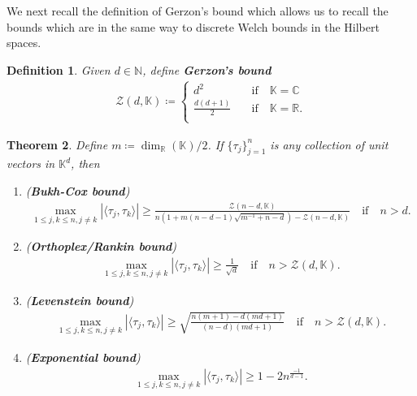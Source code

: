 \documentclass{amsart}
\newtheorem{theorem}{Theorem}[section]
\newtheorem{definition}[theorem]{Definition}
\begin{document}
We next recall the definition of Gerzon's bound which allows us to recall  the bounds which are in the same way  to discrete Welch bounds in the Hilbert spaces. 
 \begin{definition}\cite{JASPERKINGMIXON}
	Given $d\in \mathbb{N}$, define \textbf{Gerzon's bound}
	\begin{align*}
		\mathcal{Z}(d, \mathbb{K})\coloneqq 
		\left\{ \begin{array}{cc} 
			d^2 & \quad \text{if} \quad \mathbb{K} =\mathbb{C}\\
			\frac{d(d+1)}{2} & \quad \text{if} \quad \mathbb{K} =\mathbb{R}.\\
		\end{array} \right.
	\end{align*}	
\end{definition}
\begin{theorem}\cite{JASPERKINGMIXON, XIACORRECTION, MUKKAVILLISABHAWALERKIPAAZHANG, SOLTANALIAN, BUKHCOX, CONWAYHARDINSLOANE, HAASHAMMENMIXON, RANKIN}  \label{LEVENSTEINBOUND}
	Define $m\coloneqq \operatorname{dim}_{\mathbb{R}}(\mathbb{K})/2$.	If	$\{\tau_j\}_{j=1}^n$  is any collection of  unit vectors in $\mathbb{K}^d$, then
	\begin{enumerate}[\upshape(i)]
		\item (\textbf{Bukh-Cox bound})
		\begin{align*}
			\max _{1\leq j,k \leq n, j\neq k}|\langle \tau_j, \tau_k\rangle |\geq \frac{\mathcal{Z}(n-d, \mathbb{K})}{n(1+m(n-d-1)\sqrt{m^{-1}+n-d})-\mathcal{Z}(n-d, \mathbb{K})}\quad \text{if} \quad n>d.
		\end{align*}
		\item (\textbf{Orthoplex/Rankin bound})	
		\begin{align*}
			\max _{1\leq j,k \leq n, j\neq k}|\langle \tau_j, \tau_k\rangle |\geq\frac{1}{\sqrt{d}} \quad \text{if} \quad n>\mathcal{Z}(d, \mathbb{K}).
		\end{align*}
		\item (\textbf{Levenstein bound})	
		\begin{align*}
			\max _{1\leq j,k \leq n, j\neq k}|\langle \tau_j, \tau_k\rangle |\geq \sqrt{\frac{n(m+1)-d(md+1)}{(n-d)(md+1)}} \quad \text{if} \quad n>\mathcal{Z}(d, \mathbb{K}).
		\end{align*}
		\item (\textbf{Exponential bound})
		\begin{align*}
			\max _{1\leq j,k \leq n, j\neq k}|\langle \tau_j, \tau_k\rangle |\geq 1-2n^{\frac{-1}{d-1}}.
		\end{align*}
	\end{enumerate}	
\end{theorem}
\end{document}
